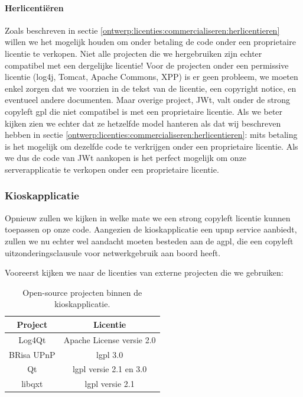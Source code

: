 \paragraph{Herlicentiëren} Zoals beschreven in sectie \ref{ontwerp:licenties:commercialiseren:herlicentieren} willen we het mogelijk houden om onder betaling de code onder een proprietaire licentie te verkopen. Niet alle projecten die we hergebruiken zijn echter compatibel met een dergelijke licentie! Voor de projecten onder een permissive licentie (log4j, Tomcat, Apache Commons, XPP) is er geen probleem, we moeten enkel zorgen dat we voorzien in de tekst van de licentie, een copyright notice, en eventueel andere documenten. Maar overige project, JWt, valt onder de strong copyleft \ac{gpl} die niet compatibel is met een proprietaire licentie. Als we beter kijken zien we echter dat ze hetzelfde model hanteren als dat wij beschreven hebben in sectie \ref{ontwerp:licenties:commercialiseren:herlicentieren}: mits betaling is het mogelijk om dezelfde code te verkrijgen onder een proprietaire licentie. Als we dus de code van JWt aankopen is het perfect mogelijk om onze serverapplicatie te verkopen onder een proprietaire licentie.

\subsubsection{Kioskapplicatie}
\label{ontwerp:licenties:keuze:software:kiosk}

Opnieuw zullen we kijken in welke mate we een strong copyleft licentie kunnen toepassen op onze code. Aangezien de kioskapplicatie een \ac{upnp} service aanbiedt, zullen we nu echter wel aandacht moeten besteden aan de \ac{agpl}, die een copyleft uitzonderingsclausule voor netwerkgebruik aan boord heeft.

Vooreerst kijken we naar de licenties van externe projecten die we gebruiken:
\begin{table}[h!]
  \begin{center}
    \begin{tabular}{c c}
    Project & Licentie \\
    \hline
    Log4Qt & Apache License versie 2.0 \\
    BRisa UPnP & \ac{lgpl} 3.0 \\
    Qt & \ac{lgpl} versie 2.1 en 3.0 \\
    libqxt & \ac{lgpl} versie 2.1 \\
    \end{tabular}
  \end{center}
  \caption{Open-source projecten binnen de kioskapplicatie.}
\end{table}

